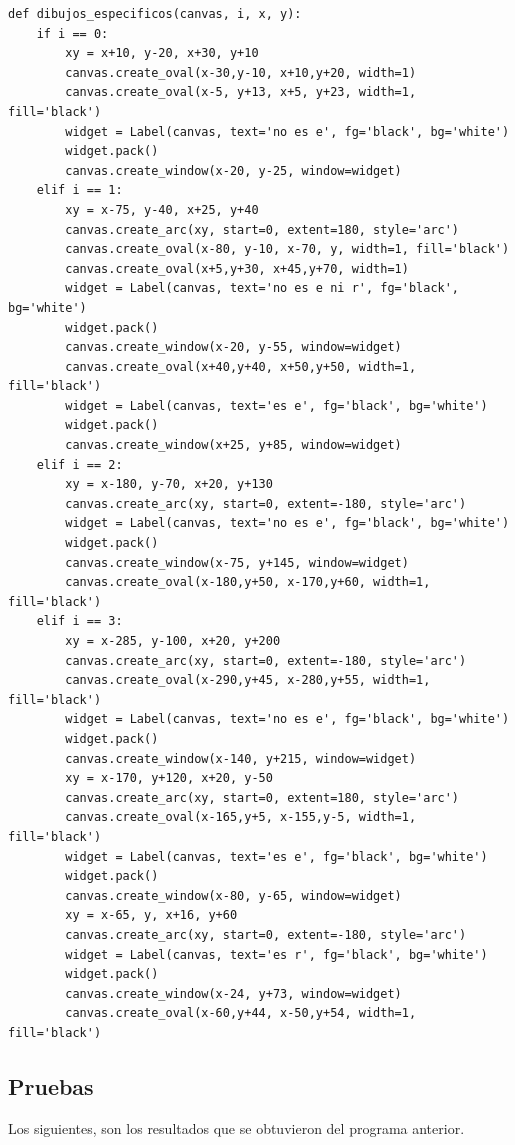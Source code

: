\documentclass[12pt]{article}
\begin{document}
\begin{lstlisting}[frame=single]
def dibujos_especificos(canvas, i, x, y):
    if i == 0:
        xy = x+10, y-20, x+30, y+10
        canvas.create_oval(x-30,y-10, x+10,y+20, width=1)
        canvas.create_oval(x-5, y+13, x+5, y+23, width=1, fill='black')
        widget = Label(canvas, text='no es e', fg='black', bg='white')
        widget.pack()
        canvas.create_window(x-20, y-25, window=widget)
    elif i == 1:
        xy = x-75, y-40, x+25, y+40
        canvas.create_arc(xy, start=0, extent=180, style='arc')
        canvas.create_oval(x-80, y-10, x-70, y, width=1, fill='black')
        canvas.create_oval(x+5,y+30, x+45,y+70, width=1)
        widget = Label(canvas, text='no es e ni r', fg='black', bg='white')
        widget.pack()
        canvas.create_window(x-20, y-55, window=widget)
        canvas.create_oval(x+40,y+40, x+50,y+50, width=1, fill='black')
        widget = Label(canvas, text='es e', fg='black', bg='white')
        widget.pack()
        canvas.create_window(x+25, y+85, window=widget)
    elif i == 2:
        xy = x-180, y-70, x+20, y+130
        canvas.create_arc(xy, start=0, extent=-180, style='arc')
        widget = Label(canvas, text='no es e', fg='black', bg='white')
        widget.pack()
        canvas.create_window(x-75, y+145, window=widget)
        canvas.create_oval(x-180,y+50, x-170,y+60, width=1, fill='black')
    elif i == 3:
        xy = x-285, y-100, x+20, y+200
        canvas.create_arc(xy, start=0, extent=-180, style='arc')
        canvas.create_oval(x-290,y+45, x-280,y+55, width=1, fill='black')
        widget = Label(canvas, text='no es e', fg='black', bg='white')
        widget.pack()
        canvas.create_window(x-140, y+215, window=widget)
        xy = x-170, y+120, x+20, y-50
        canvas.create_arc(xy, start=0, extent=180, style='arc')
        canvas.create_oval(x-165,y+5, x-155,y-5, width=1, fill='black')
        widget = Label(canvas, text='es e', fg='black', bg='white')
        widget.pack()
        canvas.create_window(x-80, y-65, window=widget)
        xy = x-65, y, x+16, y+60
        canvas.create_arc(xy, start=0, extent=-180, style='arc')
        widget = Label(canvas, text='es r', fg='black', bg='white')
        widget.pack()
        canvas.create_window(x-24, y+73, window=widget)
        canvas.create_oval(x-60,y+44, x-50,y+54, width=1, fill='black')

\end{lstlisting}

\subsection{Pruebas}
Los siguientes, son los resultados que se obtuvieron del programa anterior.
\end{document}
